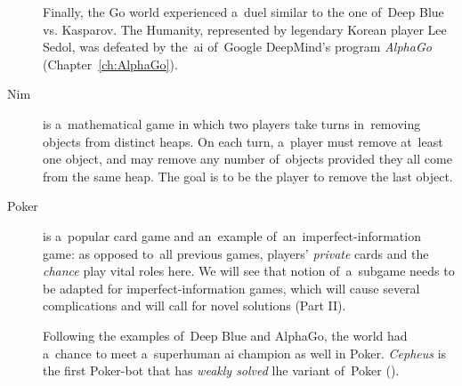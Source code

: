 \begin{description}
    Finally, the Go world experienced a~duel similar to the one of~Deep Blue vs. Kasparov.
    The Humanity, represented by legendary Korean player Lee Sedol, was defeated by the~\acrshort{ai} of~Google DeepMind's program \emph{AlphaGo} (Chapter~\ref{ch:AlphaGo}).

  \item [Nim] is a~mathematical game in which two players take turns in~removing objects from distinct heaps.
    On each turn, a~player must remove at~least one object, and may remove any number of~objects provided they all come from the same heap.
    The goal is to be the player to remove the last object.

  \item [Poker] is a~popular card game\footnotemark{} and an~example of~an~imperfect-information game: as opposed to~all previous games, players' \emph{private} cards and the \emph{chance} play vital roles here.
    We will see that notion of~a~subgame needs to be adapted for imperfect-information games, which will cause several complications and will call for novel solutions (Part II).

    Following the examples of~Deep Blue and AlphaGo, the world had a~chance to meet a~superhuman \acrshort{ai} champion as well in Poker.
    \emph{Cepheus} is the first Poker-bot that has \emph{weakly solved} \acrlong{lhe} variant of~Poker (\cite{Bowling2015heads}).
\end{description}



